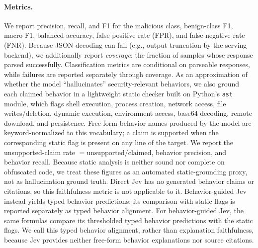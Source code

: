 \paragraph{Metrics.} We report precision, recall, and F1 for the malicious
class, benign-class F1, macro-F1, balanced accuracy, false-positive rate
(FPR), and false-negative rate (FNR). Because JSON decoding can fail (e.g.,
output truncation by the serving backend), we additionally report
\emph{coverage}: the fraction of samples whose response parsed successfully.
Classification metrics are conditional on parseable responses, while failures
are reported separately through coverage.
As an approximation of whether the model ``hallucinates'' security-relevant
behaviors, we also ground each claimed behavior in a lightweight static
checker built on Python's \texttt{ast} module, which flags shell execution,
process creation, network access, file writes/deletion, dynamic execution,
environment access, base64 decoding, remote download, and persistence.
Free-form behavior names produced by the model are keyword-normalized to this
vocabulary; a claim is supported when the corresponding static flag is
present on any line of the target. We report the unsupported-claim rate
$= \mathrm{unsupported} / \mathrm{claimed}$, behavior precision, and behavior
recall. Because static analysis is neither sound nor complete on obfuscated
code, we treat these figures as an automated static-grounding proxy,
not as hallucination ground truth. Direct Jev has no generated behavior claims
or citations, so this faithfulness metric is not applicable to it.
Behavior-guided Jev instead yields typed behavior predictions; its comparison
with static flags is reported separately as typed behavior alignment.
For behavior-guided Jev, the same formulas compare its thresholded typed
behavior predictions with the static flags. We call this typed behavior
alignment, rather than explanation faithfulness, because Jev provides neither
free-form behavior explanations nor source citations.
\endinput
